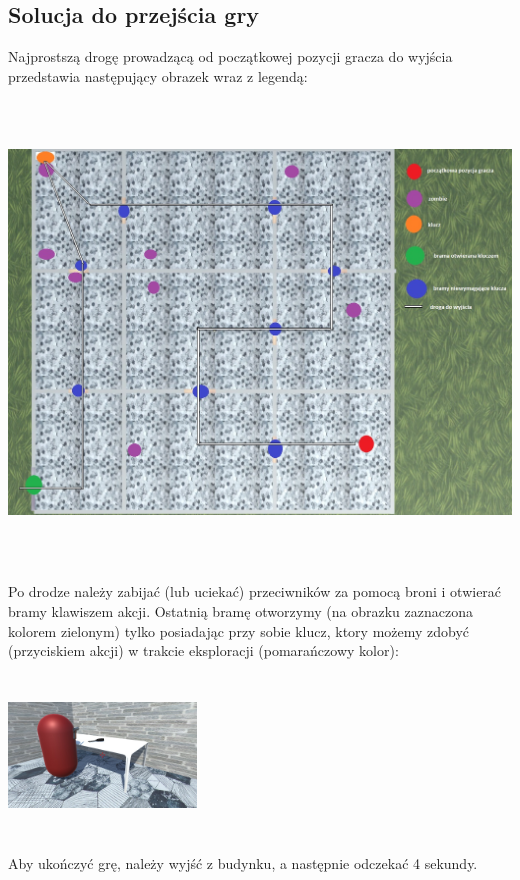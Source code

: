 \documentclass[12pt,a4paper]{article}
\newcommand{\si}{ś}
\begin{document}
	\subsection*{Solucja do przejścia gry}
 	Najprostszą drogę prowadzącą od początkowej pozycji gracza do wyj\si cia przedstawia następujący obrazek wraz z legendą: \\
 	\includegraphics[height=13cm, width=15cm]{6.jpg}\\
 	Po drodze należy zabijać (lub uciekać) przeciwników za pomocą broni i otwierać bramy klawiszem akcji. Ostatnią bramę otworzymy (na obrazku zaznaczona kolorem zielonym) tylko posiadając przy sobie klucz, ktory możemy zdobyć (przyciskiem akcji) w trakcie eksploracji (pomarańczowy kolor): \\
 	\includegraphics[height=5cm, width=5cm]{3.jpg}\\
 	Aby ukończyć grę, należy wyj\si ć z budynku, a następnie odczekać 4 sekundy.
\newpage
\end{document}
